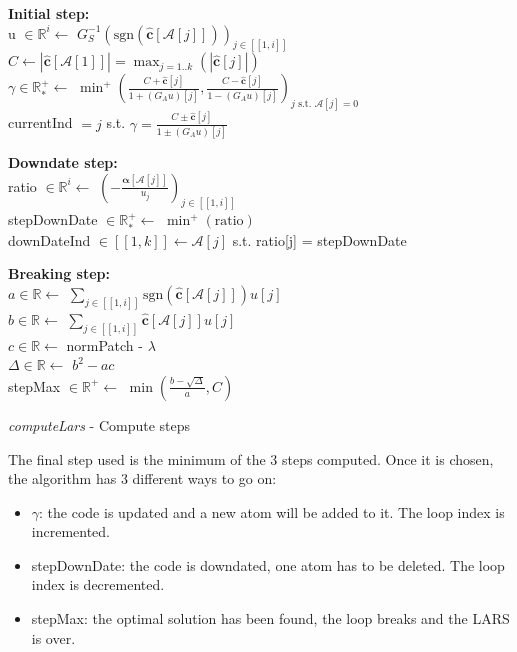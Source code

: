 \documentclass{ipol}
\newcommand{\dsize}{k}
\newcommand{\code}{\bm{\alpha}}
\newcommand{\clars}{\hat{\textbf{c}}}
\newcommand{\A}{\mathcal{A}}
\begin{document}
\begin{algorithm}[H]
\textbf{Initial step:}\\
\vspace{0.5mm}
u $\in \mathbb{R}^i \leftarrow$ $G_S^{-1} (\text{sgn}(\clars[\A[j]]))_{j\in [\![1, i]\!]}$\\
$C \leftarrow |\clars[\A[1]]| = \max_{j=1..\dsize}(|\clars[j]|)$\\
$\gamma \in \mathbb{R}^+_* \leftarrow$ $\min^+\left(\frac{C + \clars[j]}{1 + (G_Au)[j]}, \frac{C - \clars[j]}{1 - (G_Au)[j]}\right)_{j \text{ s.t. } \A[j] = 0}$\\
currentInd $=j$ s.t. $\gamma = \frac{C \pm \clars[j]}{1 \pm (G_Au)[j]}$\\
\vspace{2mm}

\textbf{Downdate step:}\\
\vspace{0.5mm}
ratio $\in \mathbb{R}^i \leftarrow$ $\left(-\frac{\code[\A[j]]}{u_j}\right)_{j\in[\![1, i]\!]}$\\
stepDownDate $\in \mathbb{R}^+_* \leftarrow$ $\min^+(\text{ratio})$ \\
downDateInd $\in [\![1, \dsize]\!] \leftarrow \A[j]$ s.t. ratio[j] =	stepDownDate\\
\vspace{2mm}

\textbf{Breaking step:}\\
\vspace{0.5mm}
$a \in \mathbb{R} \leftarrow$ $\sum_{j \in [\![1, i]\!]} \text{sgn}(\clars[\A[j]])u[j]$\\
$b \in \mathbb{R} \leftarrow$ $\sum_{j \in [\![1, i]\!]} \clars[\A[j]] u[j]$\\
$c \in \mathbb{R} \leftarrow$ normPatch - $\lambda$\\
$\Delta \in \mathbb{R} \leftarrow$ $b^2 - ac$ \\
stepMax $\in \mathbb{R}^+ \leftarrow$ $\min(\frac{b - \sqrt{\Delta}}{a}, C)$ \\
\vspace{2mm}

\caption{\textit{computeLars} - Compute steps}
\end{algorithm}

\newpage

\noindent The final step used is the minimum of the 3 steps computed. Once it is chosen, the algorithm has 3 different ways to go on:
\begin{itemize}
	\item $\gamma$: the code is updated and a new atom will be added to it. The loop index is incremented.
	\item stepDownDate: the code is downdated, one atom has to be deleted. The loop index is decremented.
	\item stepMax: the optimal solution has been found, the loop breaks and the LARS is over.
\end{itemize}
\end{document}
